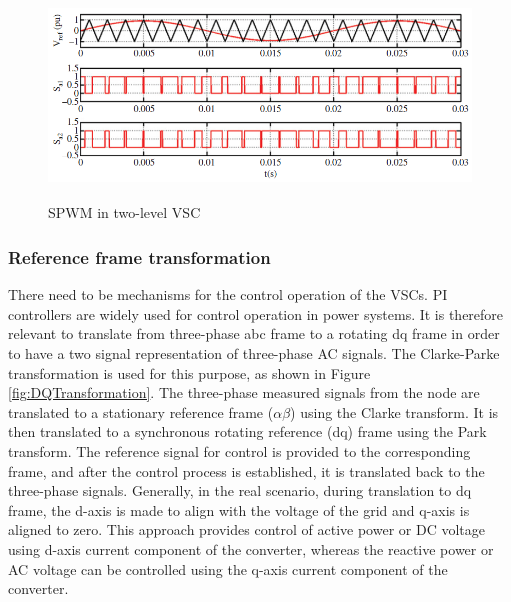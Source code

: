 \begin{figure}[H]
\centering
    \includegraphics[height = 5.5cm,width = 13.5cm]{Diagrams/Chapter_2/2levelVSC_switching.PNG}
    \caption{SPWM in two-level VSC \cite{noauthor_appendix_2014-1}}
    \label{fig:2levelVSC_switching}
\end{figure}

\subsubsection{Reference frame transformation}\label{ref_frame_trafo}
There need to be mechanisms for the control operation of the \gls{VSC}s. \gls{PI} controllers are widely used for control operation in power systems. It is therefore relevant to translate from three-phase abc frame to a rotating dq frame in order to have a two signal representation of three-phase \gls{AC} signals. The Clarke-Parke transformation is used for this purpose, as shown in Figure \ref{fig:DQTransformation}. The three-phase measured signals from the node are translated to a stationary reference frame ($\alpha \beta$) using the Clarke transform. It is then translated to a synchronous rotating reference (dq) frame using the Park transform. The reference signal for control is provided to the corresponding frame, and after the control process is established, it is translated back to the three-phase signals. Generally, in the real scenario, during translation to dq frame, the d-axis is made to align with the voltage of the grid and q-axis is aligned to zero. This approach provides control of active power or \gls{DC} voltage using d-axis current component of the converter, whereas the reactive power or \gls{AC} voltage can be controlled using the q-axis current component of the converter.   

